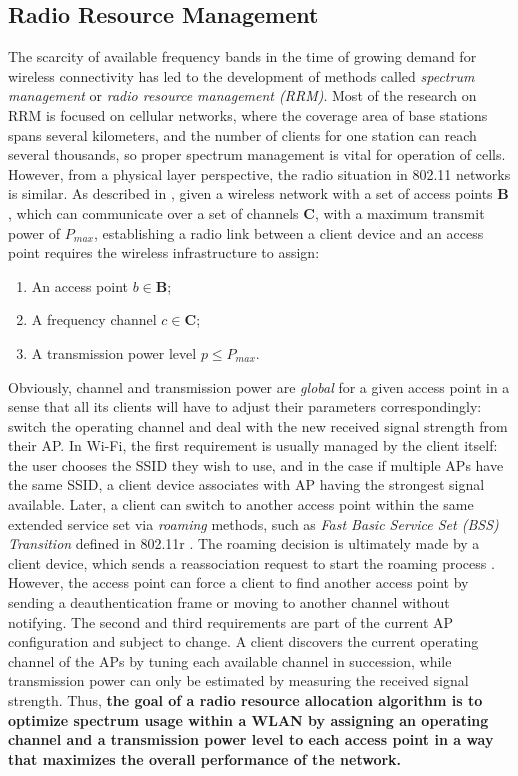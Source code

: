 \subsection{Radio Resource Management}
\label{chap:intro:sec:rrm}
The scarcity of available frequency bands in the time of growing demand for wireless connectivity has led to the development of methods called \textit{spectrum management} or \textit{radio resource management (RRM)}. Most of the research on RRM is focused on cellular networks, where the coverage area of base stations spans several kilometers, and the number of clients for one station can reach several thousands, so proper spectrum management is vital for operation of cells. However, from a physical layer perspective, the radio situation in 802.11 networks is similar. As described in \cite{zanderRadioResourceManagement1997}, given a wireless network with a set of access points $\boldsymbol{B}$, which can communicate over a set of channels $\boldsymbol{C}$, with a maximum transmit power of $P_{max}$, establishing a radio link between a client device and an access point requires the wireless infrastructure to assign:
\begin{enumerate}
    \item An access point $b \in \boldsymbol{B}$;
    \item A frequency channel $c \in \boldsymbol{C}$;
    \item A transmission power level $ p \leq P_{max}$.
\end{enumerate}
Obviously, channel and transmission power are \textit{global} for a given access point in a sense that all its clients will have to adjust their parameters correspondingly: switch the operating channel and deal with the new received signal strength from their AP.
In Wi-Fi, the first requirement is usually managed by the client itself: the user chooses the SSID they wish to use, and in the case if multiple APs have the same SSID, a client device associates with AP having the strongest signal available. Later, a client can switch to another access point within the same extended service set via \textit{roaming} methods, such as \textit{Fast Basic Service Set (BSS) Transition} defined in 802.11r \cite{ieee80211r}. The roaming decision is ultimately made by a client device, which sends a reassociation request to start the roaming process \cite{colemanCWNACertifiedWireless2021}. However, the access point can force a client to find another access point by sending a deauthentication frame or moving to another channel without notifying.
The second and third requirements are part of the current AP configuration and subject to change. A client discovers the current operating channel of the APs by tuning each available channel in succession, while transmission power can only be estimated by measuring the received signal strength.
Thus, \textbf{the goal of a radio resource allocation algorithm is to optimize spectrum usage within a WLAN by assigning an operating channel and a transmission power level to each access point in a way that maximizes the overall performance of the network.}

